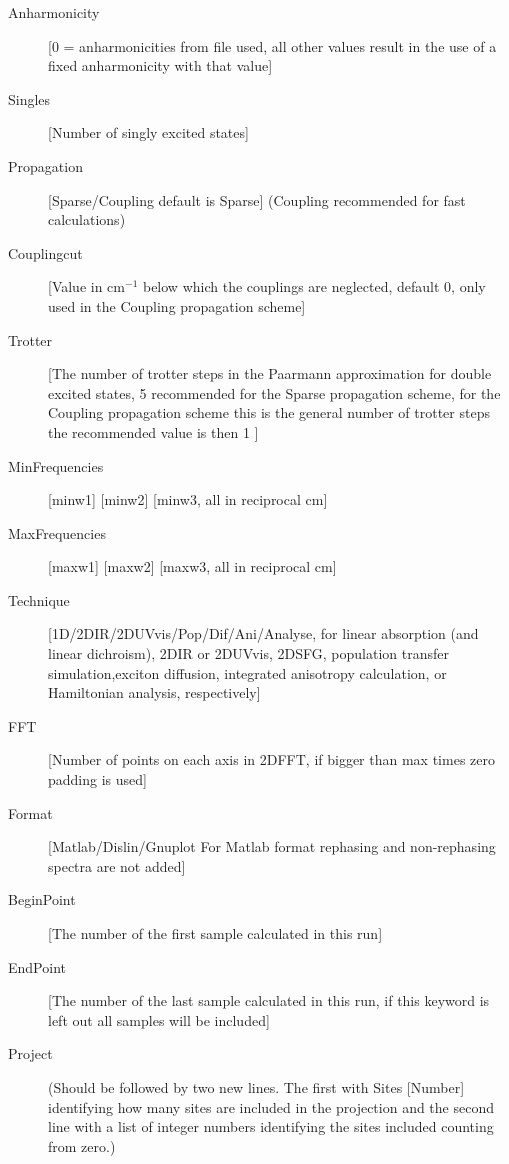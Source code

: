 \begin{description}
\item [Anharmonicity] [0 = anharmonicities from file used, all other values result in the use of a fixed anharmonicity with that value]
\item [Singles] [Number of singly excited states]
\item [Propagation] [Sparse/Coupling default is Sparse] (Coupling recommended for fast calculations)
\item [Couplingcut] [Value in cm$^{-1}$ below which the couplings are neglected, default 0, only used in the Coupling propagation scheme]
\item [Trotter] [The number of trotter steps in the Paarmann approximation for double excited 
states, 5 recommended for the Sparse propagation scheme, for the Coupling propagation scheme this is the general number of trotter steps the recommended value is then 1 ]
\item [MinFrequencies] [minw1] [minw2] [minw3, all in reciprocal cm]
\item [MaxFrequencies] [maxw1] [maxw2] [maxw3, all in reciprocal cm]
\item [Technique] [1D/2DIR/2DUVvis/Pop/Dif/Ani/Analyse, for linear absorption (and linear dichroism), 2DIR or 2DUVvis, 2DSFG, population transfer simulation,exciton diffusion, integrated anisotropy calculation, or Hamiltonian analysis, respectively]
\item [FFT] [Number of points on each axis in 2DFFT, if bigger than max times zero padding is used]
\item [Format] [Matlab/Dislin/Gnuplot For Matlab format rephasing and non-rephasing spectra are not added] 
\item [BeginPoint] [The number of the first sample calculated in this run]
\item [EndPoint] [The number of the last sample calculated in this run, if this keyword is left out all samples will be included]
\item [Project] (Should be followed by two new lines. The first with Sites [Number] identifying how many sites are included in the projection and the second line with a list of integer numbers identifying the sites included counting from zero.)
\end{description}

